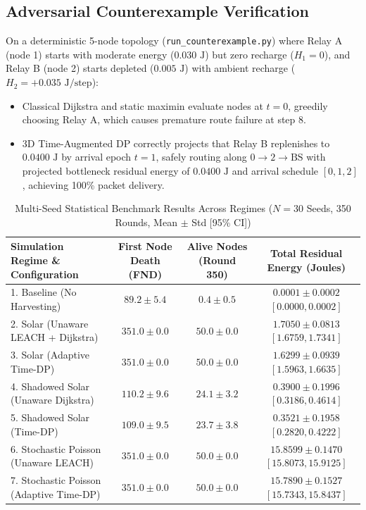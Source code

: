 \documentclass[conference]{IEEEtran}
\begin{document}
\subsection{Adversarial Counterexample Verification}
On a deterministic 5-node topology (\texttt{run\_counterexample.py}) where Relay A (node 1) starts with moderate energy ($0.030\text{ J}$) but zero recharge ($H_1 = 0$), and Relay B (node 2) starts depleted ($0.005\text{ J}$) with ambient recharge ($H_2 = +0.035\text{ J/step}$):
\begin{itemize}
    \item Classical Dijkstra and static maximin evaluate nodes at $t=0$, greedily choosing Relay A, which causes premature route failure at step 8.
    \item 3D Time-Augmented DP correctly projects that Relay B replenishes to $0.0400\text{ J}$ by arrival epoch $t=1$, safely routing along $0 \to 2 \to \text{BS}$ with projected bottleneck residual energy of $0.0400\text{ J}$ and arrival schedule $[0, 1, 2]$, achieving 100\% packet delivery.
\end{itemize}

\begin{table}[!t]
\caption{Multi-Seed Statistical Benchmark Results Across Regimes ($N = 30$ Seeds, 350 Rounds, Mean $\pm$ Std [95\% CI])}
\label{tab:multi_seed}
\centering
\begin{tabular}{@{}lccc@{}}
\toprule
\textbf{Simulation Regime \& Configuration} & \textbf{First Node Death (FND)} & \textbf{Alive Nodes (Round 350)} & \textbf{Total Residual Energy (Joules)} \\
\midrule
1. Baseline (No Harvesting) & $89.2 \pm 5.4$ & $0.4 \pm 0.5$ & $0.0001 \pm 0.0002$ $[0.0000, 0.0002]$ \\
2. Solar (Unaware LEACH + Dijkstra) & $351.0 \pm 0.0$ & $50.0 \pm 0.0$ & $\mathbf{1.7050 \pm 0.0813}$ $[1.6759, 1.7341]$ \\
3. Solar (Adaptive Time-DP) & $351.0 \pm 0.0$ & $50.0 \pm 0.0$ & $1.6299 \pm 0.0939$ $[1.5963, 1.6635]$ \\
4. Shadowed Solar (Unaware Dijkstra) & $\mathbf{110.2 \pm 9.6}$ & $\mathbf{24.1 \pm 3.2}$ & $\mathbf{0.3900 \pm 0.1996}$ $[0.3186, 0.4614]$ \\
5. Shadowed Solar (Time-DP) & $109.0 \pm 9.5$ & $23.7 \pm 3.8$ & $0.3521 \pm 0.1958$ $[0.2820, 0.4222]$ \\
6. Stochastic Poisson (Unaware LEACH) & $351.0 \pm 0.0$ & $50.0 \pm 0.0$ & $\mathbf{15.8599 \pm 0.1470}$ $[15.8073, 15.9125]$ \\
7. Stochastic Poisson (Adaptive Time-DP) & $351.0 \pm 0.0$ & $50.0 \pm 0.0$ & $15.7890 \pm 0.1527$ $[15.7343, 15.8437]$ \\
\bottomrule
\end{tabular}
\end{table}
\end{document}
